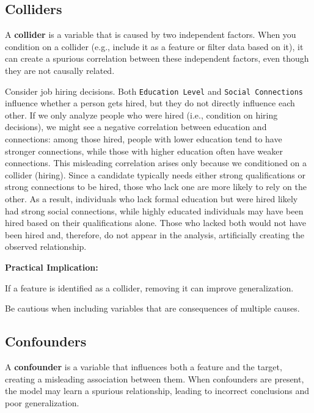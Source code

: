 \documentclass[12pt,openany]{book}
\begin{document}
\subsection{Colliders}

A \textbf{collider} is a variable that is caused by two independent factors. When you condition on a collider (e.g., include it as a feature or filter data based on it), it can create a spurious correlation between these independent factors, even though they are not causally related.

\begin{examplebox}
Consider job hiring decisions. Both \texttt{Education Level} and \texttt{Social Connections} influence whether a person gets hired, but they do not directly influence each other. If we only analyze people who were hired (i.e., condition on hiring decisions), we might see a negative correlation between education and connections: among those hired, people with lower education tend to have stronger connections, while those with higher education often have weaker connections. This misleading correlation arises only because we conditioned on a collider (hiring). Since a candidate typically needs either strong qualifications or strong connections to be hired, those who lack one are more likely to rely on the other. As a result, individuals who lack formal education but were hired likely had strong social connections, while highly educated individuals may have been hired based on their qualifications alone. Those who lacked both would not have been hired and, therefore, do not appear in the analysis, artificially creating the observed relationship.
\end{examplebox}

\textbf{Practical Implication:}

If a feature is identified as a collider, removing it can improve generalization.

Be cautious when including variables that are consequences of multiple causes.

\subsection{Confounders}

A \textbf{confounder} is a variable that influences both a feature and the target, creating a misleading association between them. When confounders are present, the model may learn a spurious relationship, leading to incorrect conclusions and poor generalization.
\newline
\end{document}

